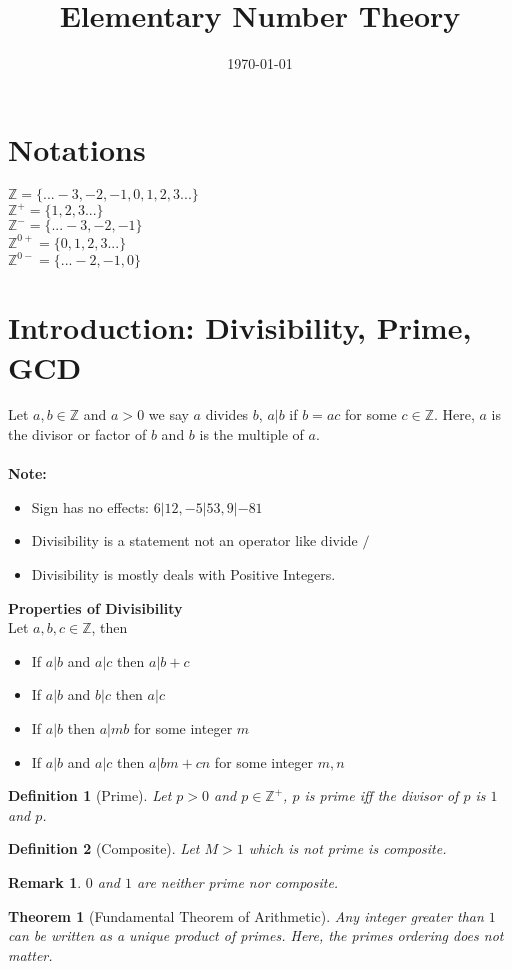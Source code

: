 \documentclass[12pt,a4paper]{article}
\title{Elementary Number Theory \vspace{0.0em}}
\date{\today}
\newcommand{\Z}{\mathbb{Z}}
\newtheorem{thm}{Theorem}
\newtheorem{defn}{Definition}
\newtheorem{rem}{Remark}
\begin{document}
  \maketitle
  \section*{Notations}
  $\Z = \{... -3,-2,-1,0,1,2,3...\}$ \\
  $\Z^{+} = \{1,2,3...\}$ \\
  $\Z^{-} = \{... -3,-2,-1\}$ \\
  $\Z^{0+} = \{0,1,2,3...\}$ \\
  $\Z^{0-} = \{...-2,-1,0\}$
  \section{Introduction: Divisibility, Prime, GCD}
  Let $a,b \in \Z$ and $a>0$ we say $a$ divides $b$, $a|b$ if $b=ac$ for some $c\in \Z$. Here, $a$ is the divisor or factor of $b$ and $b$ is the multiple of $a$.
  \\ \\
 \textbf{Note: }
  \begin{itemize}
  	\item Sign has no effects: $6|12, -5|53, 9|-81$
  	\item Divisibility is a statement not an operator like divide $/$
  	\item Divisibility is mostly deals with Positive Integers.
  \end{itemize}
\textbf{Properties of Divisibility}\\
Let $a,b,c \in \Z$, then
\begin{itemize}
	\item If $a|b$ and $a|c$ then $a|b+c$
	\item If $a|b$ and $b|c$ then $a|c$
	\item If $a|b$ then $a|mb$ for some integer $m$
	\item If $a|b$ and $a|c$ then $a|bm+cn$ for some integer $m,n$ 
\end{itemize}

\begin{defn}[Prime]\normalfont
	Let $p>0$ and $p\in \Z^{+}$, $p$ is prime iff the divisor of $p$ is $1$ and $p$.
\end{defn}

\begin{defn}[Composite]\normalfont
	Let $M>1$ which is not prime is composite.
\end{defn}
\begin{rem}\normalfont
	$0$ and $1$ are neither prime nor composite.
\end{rem}
\begin{thm}[Fundamental Theorem of Arithmetic]\normalfont
	Any integer greater than $1$ can be written as a unique product of primes. Here, the primes ordering does not matter.
\end{thm}
\end{document}
